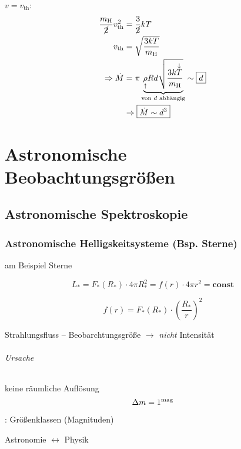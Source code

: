 $v = v_{\mathrm{th}}$:
\begin{align*}
    \frac{m_{\mathrm{H}}}{\cancel{2}} v_{\mathrm{th}}^2 &= \frac{3}{\cancel{2}} kT \\
    v_{\mathrm{th}} &= \sqrt{\frac{3kT}{m_{\mathrm{H}}}} \\
    \Rightarrow \dot M &= \pi \underbrace{\underset{\uparrow}{\rho} R d \sqrt{\frac{3k\overset{\downarrow}{T}}{m_{\mathrm{H}}}}}_{\text{von $d$ abhängig}} \sim \boxed{d} \\
                       &\Rightarrow \boxed{\dot M \sim d^3}
\end{align*}

\part{Astronomische Beobachtungsgrößen}
\chapter{Astronomische Spektroskopie}
\section[Astronomische Helligskeitsysteme]{Astronomische Helligskeitsysteme (Bsp. Sterne)}
am Beispiel Sterne


\[ L_* = F_*(R_*) \cdot 4 \pi R_*^2 = f(r) \cdot 4 \pi r^2 = \mathbf{const} \]

\[ \boxed{f(r) = F_*(R_*) \cdot \left(\frac{R_*}{r}\right)^2} \]

Strahlungsfluss -- Beobarchtungsgröße $\rightarrow$ \emph{nicht} Intensität

\paragraph{Ursache} keine räumliche Auflösung
\[ \Delta m = 1^{\mathrm{mag}} \]

: Größenklassen (Magnituden)


\begin{center}
    Astronomie $\longleftrightarrow$ Physik
\end{center}


